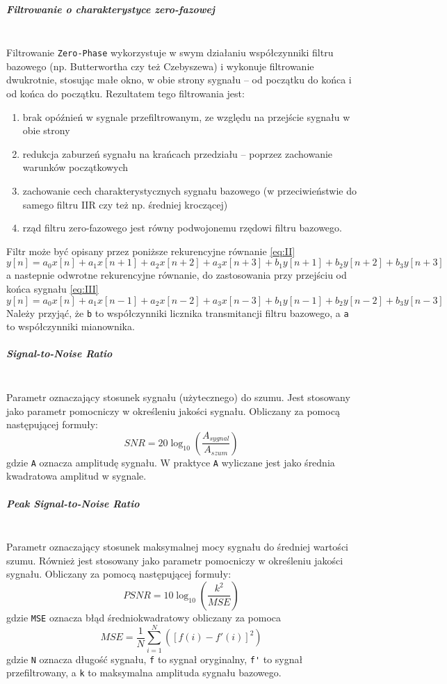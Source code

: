 \documentclass[a4paper, 11pt]{article}
\begin{document}
\subparagraph{Filtrowanie o charakterystyce zero-fazowej}
\mbox{} \\
Filtrowanie \verb|Zero-Phase| wykorzystuje w swym działaniu współczynniki filtru bazowego (np. Butterwortha czy też Czebyszewa) i wykonuje filtrowanie dwukrotnie, stosując małe okno, w obie strony sygnału -- od początku do końca i od końca do początku. Rezultatem tego filtrowania jest:
\begin{enumerate}
\item brak opóźnień w sygnale przefiltrowanym, ze względu na przejście sygnału w obie strony
\item redukcja zaburzeń sygnału na krańcach przedziału -- poprzez zachowanie warunków początkowych
\item zachowanie cech charakterystycznych sygnału bazowego (w przeciwieństwie do samego filtru IIR czy też np. średniej kroczącej)
\item rząd filtru zero-fazowego jest równy podwojonemu rzędowi filtru bazowego.
\end{enumerate}
Filtr może być opisany przez poniższe rekurencyjne równanie \eqref{eq:II}
\begin{equation}
y[n] = a_{0}x[n]+a_{1}x[n+1]+a_{2}x[n+2]+a_{3}x[n+3]+b_{1}y[n+1]+b_{2}y[n+2]+b_{3}y[n+3] \label{eq:II}
\end{equation}
a nastepnie odwrotne rekurencyjne równanie, do zastosowania przy przejściu od końca sygnału \eqref{eq:III}
\begin{equation}
y[n] = a_{0}x[n]+a_{1}x[n-1]+a_{2}x[n-2]+a_{3}x[n-3]+b_{1}y[n-1]+b_{2}y[n-2]+b_{3}y[n-3] \label{eq:III}
\end{equation}
Należy przyjąć, że \verb|b| to współczynniki licznika transmitancji filtru bazowego, a \verb|a| to współczynniki mianownika.

\subparagraph{Signal-to-Noise Ratio}
\mbox{} \\
Parametr oznaczający stosunek sygnału (użytecznego) do szumu. Jest stosowany jako parametr pomocniczy w określeniu jakości sygnału. Obliczany za pomocą następującej formuły:
\begin{equation}
SNR= 20\log_{10}(\frac{A_{sygnal}}{A_{szum}}) \label{eq:IV}
\end{equation}
gdzie \verb|A| oznacza amplitudę sygnału. W praktyce \verb|A| wyliczane jest jako średnia kwadratowa amplitud w sygnale.

\subparagraph{Peak Signal-to-Noise Ratio}
\mbox{} \\
Parametr oznaczający stosunek maksymalnej mocy sygnału do średniej wartości szumu. Również jest stosowany jako parametr pomocniczy w określeniu jakości sygnału. Obliczany za pomocą następującej formuły:
\begin{equation}
PSNR= 10\log_{10}(\frac{k^2}{MSE}) \label{eq:V}
\end{equation}
gdzie \verb|MSE| oznacza błąd średniokwadratowy obliczany za pomoca
\begin{equation}
MSE=\frac{1}{N}\sum\limits_{i=1}^N([f(i)-f'(i)]^2)\label{eq:VI}
\end{equation}
gdzie \verb|N| oznacza długość sygnału, \verb|f| to sygnał oryginalny, \verb|f'| to sygnał przefiltrowany, a \verb|k| to maksymalna amplituda sygnału bazowego.
\end{document}
